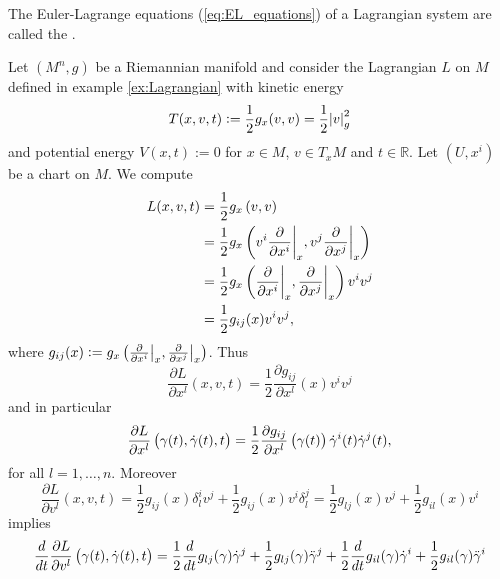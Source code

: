 \begin{definition}
	The Euler-Lagrange equations \textup{(}\ref{eq:EL_equations}\textup{)} of a Lagrangian system are called the .
\end{definition}

\begin{example}
	\label{ex:motions_on_Riemannian_manifolds}
	Let $(M^n,g)$ be a Riemannian manifold and consider the Lagrangian $L$ on $M$ defined in example \ref{ex:Lagrangian} with kinetic energy
	\begin{equation*}
		T(x,v,t) := \frac{1}{2}g_x(v,v) = \frac{1}{2}\abs{v}^2_g
	\end{equation*}
	\noindent and potential energy $V(x,t) := 0$ for $x \in M$, $v \in T_xM$ and $t \in \mathbb{R}$. Let $(U,x^i)$ be a chart on $M$. We compute
	\begin{align*}
		L(x,v,t) &= \frac{1}{2}g_{x}\del[0]{v,v}\\
		&= \frac{1}{2}g_{x}\del[3]{v^i\frac{\partial}{\partial x^i}\bigg\vert_x,v^j\frac{\partial}{\partial x^j}\bigg\vert_x}\\
		&= \frac{1}{2}g_{x}\del[3]{\frac{\partial}{\partial x^i}\bigg\vert_x,\frac{\partial}{\partial x^j}\bigg\vert_x}v^iv^j\\
		&= \frac{1}{2}g_{ij}(x)v^iv^j,
	\end{align*}
	\noindent where $g_{ij}(x) := g_{x}\del[1]{\frac{\partial}{\partial x^i}\big\vert_x,\frac{\partial}{\partial x^j}\big\vert_x}$. Thus 
	\begin{equation*}
		\frac{\partial L}{\partial x^l}(x,v,t) = \frac{1}{2}\frac{\partial g_{ij}}{\partial x^l}(x)v^i v^j
	\end{equation*}
	\noindent and in particular
	\begin{equation*}
		\frac{\partial L}{\partial x^l}\del[1]{\gamma(t),\dot{\gamma}(t),t} = \frac{1}{2}\frac{\partial g_{ij}}{\partial x^l}\del[1]{\gamma(t)}\dot{\gamma}^i(t) \dot{\gamma}^j(t),
	\end{equation*}
	\noindent for all $l = 1,\dots,n$. Moreover
	\begin{equation*}
		\frac{\partial L}{\partial v^l}(x,v,t) = \frac{1}{2}g_{ij}(x)\delta^i_lv^j + \frac{1}{2}g_{ij}(x)v^i\delta^j_l = \frac{1}{2}g_{lj}(x)v^j + \frac{1}{2}g_{il}(x)v^i
	\end{equation*}
	\noindent implies
	\begin{align*}
		\frac{d}{dt}\frac{\partial L}{\partial v^l}\del[1]{\gamma(t),\dot{\gamma}(t),t} &= \frac{1}{2}\frac{d}{dt}g_{lj}(\gamma)\dot{\gamma}^j + \frac{1}{2}g_{lj}(\gamma)\ddot{\gamma}^j + \frac{1}{2}\frac{d}{dt}g_{il}(\gamma)\dot{\gamma}^i + \frac{1}{2}g_{il}(\gamma)\ddot{\gamma}^i\\

\end{align*}
\end{example}
